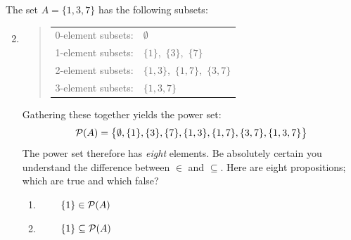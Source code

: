 \begin{examples}{}{}
	\exstart The set $A=\{1,3,7\}$ has the following subsets:
	\begin{enumerate}\setcounter{enumi}{1}
		\item[]
		\begin{quote}
			\begin{tabular}{@{}ll}
				0-element subsets:&$\emptyset$\\
				1-element subsets:&$\{1\}$,\ $\{3\}$,\ $\{7\}$\\
				2-element subsets:&$\{1,3\}$,\ $\{1,7\}$,\ $\{3,7\}$\\
				3-element subsets:&$\{1,3,7\}$
			\end{tabular}
		\end{quote}
		Gathering these together yields the power set:
		\[
			\mathcal{P}(A)=\bigl\{\emptyset,\{1\},\{3\},\{7\},\{1,3\},\{1,7\},\{3,7\},\{1,3,7\}\bigr\}
		\]
		The power set therefore has \emph{eight} elements. Be absolutely certain you understand the difference between $\in$ and $\subseteq$. Here are eight propositions; which are true and which false?\footnotemark
		\begin{enumerate}
			\item {} \  \  \ $\{1\}\in\mathcal{P}(A)$
			\setcounter{enumii}{4}
			\item {} \  \  \ $\{1\}\subseteq\mathcal{P}(A)$
		\end{enumerate}
	

\end{enumerate}
\end{examples}
